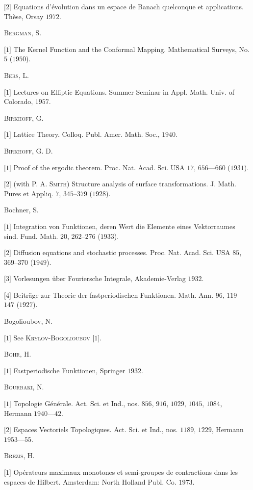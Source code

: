 [$2$] Equations d'évolution dans un espace de Banach quelconque et applications. Thèse, Orsay $1972$. 

\textsc{Bergman}, S. 

[$1$] The Kernel Function and the Conformal Mapping. Mathematical Surveys, No. $5$ ($1950$). 

\textsc{Bers}, L. 

[$1$] Lectures on Elliptic Equations. Summer Seminar in Appl. Math. Univ. of Colorado, $1957$. 

\textsc{Birkhoff}, G. 

[$1$] Lattice Theory. Colloq. Publ. Amer. Math. Soc., $1940$. 

\textsc{Birkhoff}, G. D. 

[$1$] Proof of the ergodic theorem. Proc. Nat. Acad. Sci. USA $17$, $656$---$660$ ($1931$). 

[$2$] (with P. A. \textsc{Smith}) Structure analysis of surface transformations. J. Math. Pures et Appliq. $7$, $345$--$379$ ($1928$). 

Bochner, S. 

[$1$] Integration von Funktionen, deren Wert die Elemente eines Vektorraumes sind. Fund. Math. $20$, $262$--$276$ ($1933$). 

[$2$] Diffusion equations and stochastic processes. Proc. Nat. Acad. Sci. USA $85$, $369$--$370$ ($1949$). 

[$3$] Vorlesungen über Fouriersche Integrale, Akademie-Verlag $1932$. 

[$4$] Beiträge zur Theorie der fastperiodischen Funktionen. Math. Ann. $96$, $119$---$147$ ($1927$). 

Bogolioubov, N. 

[$1$] See \textsc{Krylov}-\textsc{Bogolioubov} [$1$]. 

\textsc{Bohr}, H. 

[$1$] Fastperiodische Funktionen, Springer $1932$. 

\textsc{Bourbaki}, N. 

[$1$] Topologie Générale. Act. Sci. et Ind., nos. $856$, $916$, $1029$, $1045$, $1084$, Hermann $1940$---$42$. 

[$2$] Espaces Vectoriels Topologiques. Act. Sci. et Ind., nos. $1189$, $1229$, Hermann $1953$---$55$. 

\textsc{Brezis}, H. 

[$1$] Opérateurs maximaux monotones et semi-groupes de contractions dans les espaces de Hilbert. Amsterdam: North Holland Publ. Co. $1973$. 

